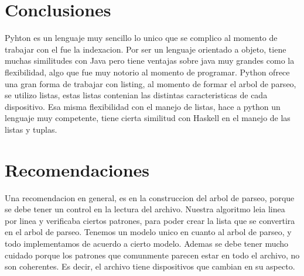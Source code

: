 \documentclass[14pt]{article} %
\begin{document}
\section{ Conclusiones}
Pyhton es un lenguaje muy sencillo lo unico que se complico al momento de trabajar con el fue la indexacion. Por ser un lenguaje
orientado a objeto, tiene muchas similitudes con Java pero tiene ventajas sobre java muy grandes como la flexibilidad, algo que fue muy notorio al momento de programar. Python ofrece una gran forma de trabajar con listing, al momento de formar el arbol de parseo, se utilizo listas, estas listas contenian las distintas caracteristicas de cada dispositivo.
Esa misma flexibilidad con el manejo de listas, hace a python un lenguaje muy competente, tiene cierta similitud con Haskell en el manejo de las listas y tuplas.

\section{ Recomendaciones}
Una recomendacion en general, es en la construccion del arbol de parseo, porque se debe tener un control en la lectura del archivo. Nuestra algoritmo leia linea por linea y verificaba ciertos patrones, para poder crear la lista que se convertira en el arbol de parseo. Tenemos un modelo unico en cuanto al arbol de parseo, y todo implementamos de acuerdo a cierto modelo. Ademas se debe tener mucho cuidado porque los patrones que comunmente parecen estar en todo el archivo, no son coherentes. Es decir, el archivo tiene dispositivos que cambian en su aspecto.
\end{document}
